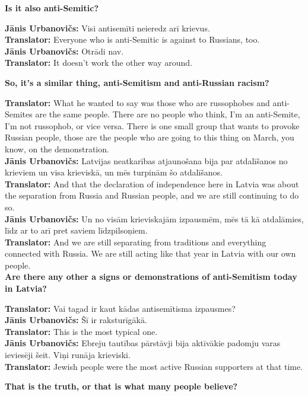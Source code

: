 \textbf{Is it also anti-Semitic?}  

\textbf{Jānis Urbanovičs:} Visi antisemīti neieredz arī krievus.\\ 
\textbf{Translator:} Everyone who is anti-Semitic is against to Russians, too.\\
\textbf{Jānis Urbanovičs:} Otrādi nav.\\ 
\textbf{Translator:} It doesn't work the other way around.  

\textbf{So, it’s a similar thing, anti-Semitism and anti-Russian racism?}  

\textbf{Translator:} What he wanted to say was those who are russophobes and anti-Semites are the same people. There are no people who think, I’m an anti-Semite, I’m not russophob, or vice versa. There is one small group that wants to provoke Russian people, those are the people who are going to this thing on March, you know, on the demonstration.\\ 
\textbf{Jānis Urbanovičs:} Latvijas neatkarības atjaunošana bija par atdalīšanos no krieviem un visa krieviskā, un mēs turpinām šo atdalīšanos.\\
\textbf{Translator:} And that the declaration of independence here in Latvia was about the separation from Russia and Russian people, and we are still continuing to do so.\\
\textbf{Jānis Urbanovičs:} Un no visām krieviskajām izpausmēm, mēs tā kā atdalāmies, līdz ar to arī pret saviem līdzpilsoņiem.\\  
\textbf{Translator:} And we are still separating from traditions and everything connected with Russia. We are still acting like that year in Latvia with our own people.\\

\textbf{Are there any other a signs or demonstrations of anti-Semitism today in Latvia?}  

\textbf{Translator:} Vai tagad ir kaut kādas antisemītisma izpausmes?\\ 
\textbf{Jānis Urbanovičs:} Šī ir raksturīgākā.\\  
\textbf{Translator:} This is the most typical one.\\ 
\textbf{Jānis Urbanovičs:} Ebreju tautības pārstāvji bija aktīvākie padomju varas ieviesēji šeit. Viņi runāja krieviski.\\  
\textbf{Translator:} Jewish people were the most active Russian supporters at that time. 

\textbf{That is the truth, or that is what many people believe?}  

